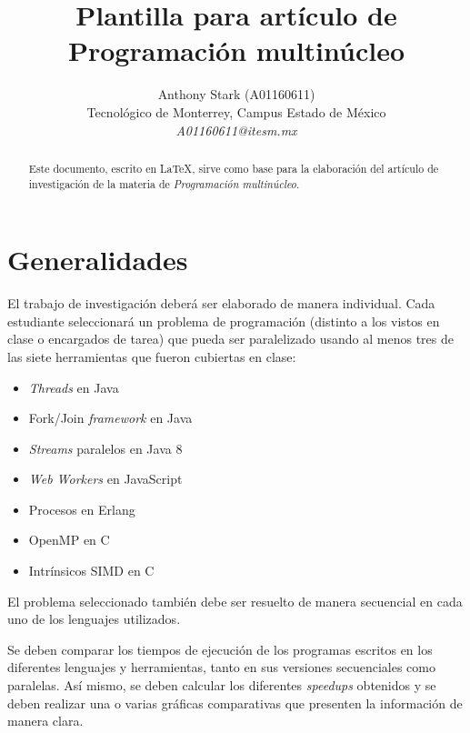 \documentclass[10pt,letterpaper,oneside]{article}
\begin{document}
\renewcommand\abstractname{Resumen}
\renewcommand\refname{Referencias}
\renewcommand{\notesname}{Notas}

\title{Plantilla para artículo de Programación multinúcleo}
\author{
\Large Anthony Stark (A01160611)
\\
Tecnológico de Monterrey, Campus Estado de México
\\  
\Large \textit{A01160611@itesm.mx}}  

\maketitle

\begin{abstract}
Este documento, escrito en \LaTeX, sirve como base para la elaboración del artículo de investigación de la materia de \textit{Programación multinúcleo}. 
\end{abstract}

\section{Generalidades}

El trabajo de investigación deberá ser elaborado de manera individual. Cada estudiante seleccionará un problema de programación (distinto a los vistos en clase o encargados de tarea) que pueda ser paralelizado usando al menos tres de las siete herramientas que fueron cubiertas en clase:
    
\begin{itemize}
    \item \textit{Threads} en Java 
    \item Fork/Join \textit{framework} en Java
    \item \textit{Streams} paralelos en Java 8
    \item \textit{Web Workers} en JavaScript
    \item Procesos en Erlang    
    \item OpenMP en C       
    \item Intrínsicos SIMD en C
\end{itemize}

El problema seleccionado también debe ser resuelto de manera secuencial en cada uno de los lenguajes utilizados. 

Se deben comparar los tiempos de ejecución de los programas escritos en los diferentes lenguajes y herramientas, tanto en sus versiones secuenciales como paralelas. Así mismo, se deben calcular los diferentes \textit{speedups} obtenidos y se deben realizar una o varias gráficas comparativas que presenten la información de manera clara.   
\end{document}
